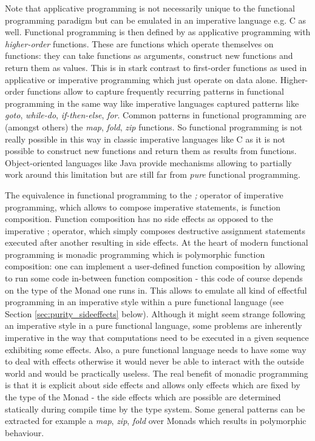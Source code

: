 Note that applicative programming is not necessarily unique to the functional programming paradigm but can be emulated in an imperative language e.g. C as well. Functional programming is then defined by \cite{maclennan_functional_1990} as applicative programming with \textit{higher-order} functions. These are functions which operate themselves on functions: they can take functions as arguments, construct new functions and return them as values. This is in stark contrast to first-order functions as used in applicative or imperative programming which just operate on data alone. Higher-order functions allow to capture frequently recurring patterns in functional programming in the same way like imperative languages captured patterns like \textit{goto}, \textit{while-do}, \textit{if-then-else}, \textit{for}. Common patterns in functional programming are (amongst others) the \textit{map}, \textit{fold}, \textit{zip} functions. So functional programming is not really possible in this way in classic imperative languages like C as it is not possible to construct new functions and return them as results from functions. Object-oriented languages like Java provide mechanisms allowing to partially work around this limitation but are still far from \textit{pure} functional programming.

The equivalence in functional programming to the \textit{;} operator of imperative programming, which allows to compose imperative statements, is function composition. Function composition has no side effects as opposed to the imperative ; operator, which simply composes destructive assignment statements executed after another resulting in side effects.
At the heart of modern functional programming is monadic programming which is polymorphic function composition: one can implement a user-defined function composition by allowing to run some code in-between function composition - this code of course depends on the type of the Monad one runs in. This allows to emulate all kind of effectful programming in an imperative style within a pure functional language (see Section \ref{sec:purity_sideeffects} below). Although it might seem strange following an imperative style in a pure functional language, some problems are inherently imperative in the way that computations need to be executed in a given sequence exhibiting some effects. Also, a pure functional language needs to have some way to deal with effects otherwise it would never be able to interact with the outside world and would be practically useless. The real benefit of monadic programming is that it is explicit about side effects and allows only effects which are fixed by the type of the Monad - the side effects which are possible are determined statically during compile time by the type system. Some general patterns can be extracted for example a \textit{map}, \textit{zip}, \textit{fold} over Monads which results in polymorphic behaviour. %

